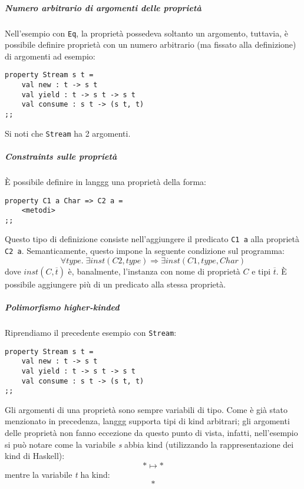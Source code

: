 \documentclass[10pt,a4paper]{article}
\begin{document}
\subparagraph{Numero arbitrario di argomenti delle proprietà}
Nell'esempio con \texttt{Eq}, la proprietà possedeva soltanto un argomento, tuttavia, è possibile definire proprietà
con un numero arbitrario (ma fissato alla definizione) di argomenti ad esempio:
\begin{lstlisting}
property Stream s t =
    val new : t -> s t
    val yield : t -> s t -> s t
    val consume : s t -> (s t, t)
;;
\end{lstlisting}
Si noti che \texttt{Stream} ha 2 argomenti.

\subparagraph{Constraints sulle proprietà}
\`E possibile definire in langgg una proprietà della forma:
\begin{lstlisting}
property C1 a Char => C2 a =
    <metodi>
;;
\end{lstlisting}
Questo tipo di definizione consiste nell'aggiungere il predicato \texttt{C1 a} alla proprietà \texttt{C2 a}.
Semanticamente, questo impone la seguente condizione sul programma:
    \[ \forall type . \; \exists inst(C2, type) \Longrightarrow \exists inst(C1, type, Char) \]
dove $ inst(C, \overline{t}) $ è, banalmente, l'instanza con nome di proprietà $ C $ e tipi $ \overline{t} $. \`E
possibile aggiungere più di un predicato alla stessa proprietà.

\subparagraph{Polimorfismo higher-kinded}
Riprendiamo il precedente esempio con \texttt{Stream}:
\begin{lstlisting}
property Stream s t =
    val new : t -> s t
    val yield : t -> s t -> s t
    val consume : s t -> (s t, t)
;;
\end{lstlisting}
Gli argomenti di una proprietà sono sempre variabili di tipo. Come è già stato menzionato in precedenza, langgg supporta
tipi di kind arbitrari; gli argomenti delle proprietà non fanno eccezione da questo punto di vista, infatti, nell'esempio
si può notare come la variabile \textit{s} abbia kind (utilizzando la rappresentazione dei kind di Haskell):
    \[ * \mapsto * \]
mentre la variabile \textit{t} ha kind:
   \[ * \]
\end{document}

